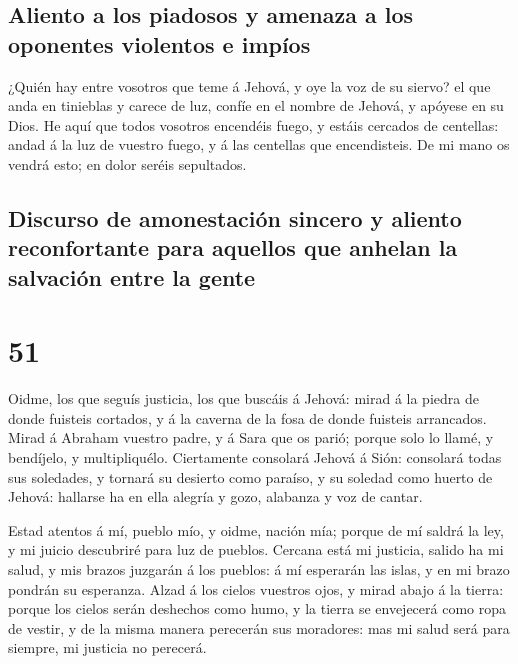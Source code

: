 \hypertarget{aliento-a-los-piadosos-y-amenaza-a-los-oponentes-violentos-e-impuxedos}{%
\subsection{Aliento a los piadosos y amenaza a los oponentes violentos e
impíos}\label{aliento-a-los-piadosos-y-amenaza-a-los-oponentes-violentos-e-impuxedos}}

 ¿Quién hay entre vosotros que teme á Jehová, y oye la
voz de su siervo? el que anda en tinieblas y carece de luz, confíe en el
nombre de Jehová, y apóyese en su Dios.  He aquí que
todos vosotros encendéis fuego, y estáis cercados de centellas: andad á
la luz de vuestro fuego, y á las centellas que encendisteis. De mi mano
os vendrá esto; en dolor seréis sepultados.

\hypertarget{discurso-de-amonestaciuxf3n-sincero-y-aliento-reconfortante-para-aquellos-que-anhelan-la-salvaciuxf3n-entre-la-gente}{%
\subsection{Discurso de amonestación sincero y aliento reconfortante
para aquellos que anhelan la salvación entre la
gente}\label{discurso-de-amonestaciuxf3n-sincero-y-aliento-reconfortante-para-aquellos-que-anhelan-la-salvaciuxf3n-entre-la-gente}}

\hypertarget{section-50}{%
\section{51}\label{section-50}}

 Oidme, los que seguís justicia, los que buscáis á Jehová:
mirad á la piedra de donde fuisteis cortados, y á la caverna de la fosa
de donde fuisteis arrancados.  Mirad á Abraham vuestro
padre, y á Sara que os parió; porque solo lo llamé, y bendíjelo, y
multipliquélo.  Ciertamente consolará Jehová á Sión:
consolará todas sus soledades, y tornará su desierto como paraíso, y su
soledad como huerto de Jehová: hallarse ha en ella alegría y gozo,
alabanza y voz de cantar.

 Estad atentos á mí, pueblo mío, y oidme, nación mía;
porque de mí saldrá la ley, y mi juicio descubriré para luz de pueblos.
 Cercana está mi justicia, salido ha mi salud, y mis
brazos juzgarán á los pueblos: á mí esperarán las islas, y en mi brazo
pondrán su esperanza.  Alzad á los cielos vuestros ojos, y
mirad abajo á la tierra: porque los cielos serán deshechos como humo, y
la tierra se envejecerá como ropa de vestir, y de la misma manera
perecerán sus moradores: mas mi salud será para siempre, mi justicia no
perecerá.

